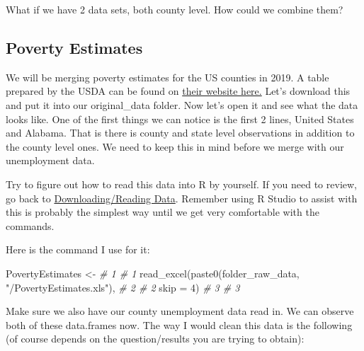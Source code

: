 \documentclass[
]{book}
\newenvironment{Shaded}{\begin{snugshade}}{\end{snugshade}}
\newcommand{\AttributeTok}[1]{\textcolor[rgb]{0.77,0.63,0.00}{#1}}
\newcommand{\CommentTok}[1]{\textcolor[rgb]{0.56,0.35,0.01}{\textit{#1}}}
\newcommand{\DecValTok}[1]{\textcolor[rgb]{0.00,0.00,0.81}{#1}}
\newcommand{\FunctionTok}[1]{\textcolor[rgb]{0.00,0.00,0.00}{#1}}
\newcommand{\NormalTok}[1]{#1}
\newcommand{\OtherTok}[1]{\textcolor[rgb]{0.56,0.35,0.01}{#1}}
\newcommand{\StringTok}[1]{\textcolor[rgb]{0.31,0.60,0.02}{#1}}
\begin{document}
What if we have 2 data sets, both county level. How could we combine them?

\hypertarget{poverty-estimates}{%
\subsection{Poverty Estimates}\label{poverty-estimates}}

We will be merging poverty estimates for the US counties in 2019. A table prepared by the USDA can be found on \href{https://www.ers.usda.gov/data-products/county-level-data-sets/download-data/}{their website here.} Let's download this and put it into our original\_data folder. Now let's open it and see what the data looks like. One of the first things we can notice is the first 2 lines, United States and Alabama. That is there is county and state level observations in addition to the county level ones. We need to keep this in mind before we merge with our unemployment data.

Try to figure out how to read this data into R by yourself. If you need to review, go back to \href{https://jmwestenberg.github.io/courses/rcourse/lesson1/lesson1_04/}{Downloading/Reading Data}. Remember using R Studio to assist with this is probably the simplest way until we get very comfortable with the commands.

Here is the command I use for it:

\begin{Shaded}
\begin{Highlighting}[]
\NormalTok{PovertyEstimates }\OtherTok{\textless{}{-}}                                             \CommentTok{\# 1  \# 1}
  \FunctionTok{read\_excel}\NormalTok{(}\FunctionTok{paste0}\NormalTok{(folder\_raw\_data, }\StringTok{"/PovertyEstimates.xls"}\NormalTok{),  }\CommentTok{\# 2  \# 2}
  \AttributeTok{skip =} \DecValTok{4}\NormalTok{)                                                     }\CommentTok{\# 3  \# 3}
\end{Highlighting}
\end{Shaded}

Make sure we also have our county unemployment data read in. We can observe both of these data.frames now. The way I would clean this data is the following (of course depends on the question/results you are trying to obtain):
\end{document}
